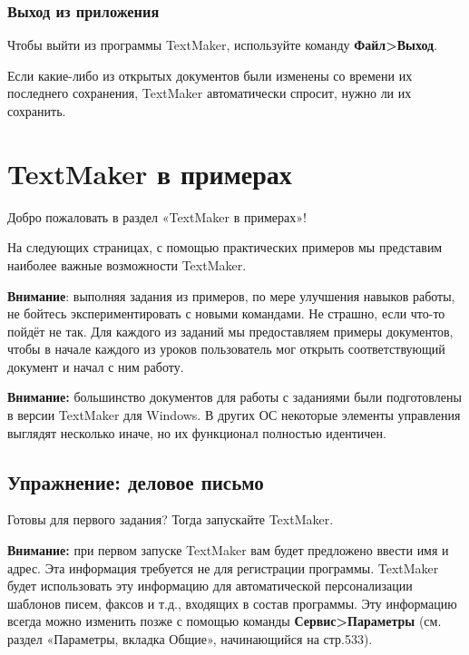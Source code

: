 \documentclass[a4paper,10pt]{article}
\begin{document}
\subsubsection{Выход из приложения}
Чтобы выйти из программы TextMaker, используйте команду \textbf{Файл>Выход}.

Если какие-либо из открытых документов были изменены со времени их последнего сохранения, TextMaker автоматически спросит, нужно ли их сохранить.

\section{TextMaker в примерах}
Добро пожаловать в раздел «TextMaker в примерах»!

На следующих страницах, с помощью практических примеров мы представим наиболее важные возможности TextMaker.

\textbf{Внимание}: выполняя задания из примеров, по мере улучшения навыков работы, не бойтесь экспериментировать с новыми командами. Не страшно, если что-то пойдёт не так. Для каждого из заданий мы предоставляем примеры документов, чтобы в начале каждого из уроков пользователь мог открыть соответствующий документ и начал с ним работу.

\begin{mdframed}[backgroundcolor=blue!10]
\textbf{Внимание:} большинство документов для работы с заданиями были подготовлены в версии TextMaker для Windows. В других ОС некоторые элементы управления выглядят несколько иначе, но их функционал полностью идентичен. 
\end{mdframed}

\subsection{Упражнение: деловое письмо}
Готовы для первого задания? Тогда запускайте TextMaker.

\begin{mdframed}[backgroundcolor=blue!10]
\textbf{Внимание:} при первом запуске TextMaker вам будет предложено ввести имя и адрес. Эта информация требуется не для регистрации программы. TextMaker будет использовать эту информацию для автоматической персонализации шаблонов писем, факсов и т.д., входящих в состав программы. Эту информацию всегда можно изменить позже с помощью команды \textbf{Сервис>Параметры} (см. раздел «Параметры, вкладка Общие», начинающийся на стр.533).
\end{mdframed}
\end{document}
